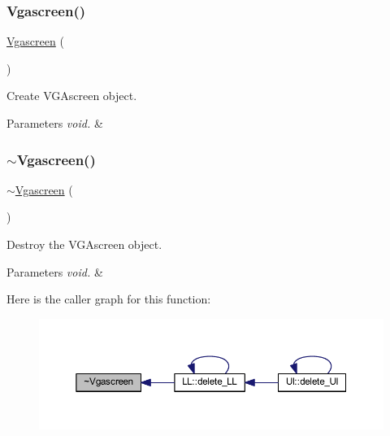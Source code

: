 \subsubsection{\texorpdfstring{Vgascreen()}{Vgascreen()}}
{\footnotesize\ttfamily \mbox{\hyperlink{class_vgascreen}{Vgascreen}} (\begin{DoxyParamCaption}\item[{void}]{ }\end{DoxyParamCaption})}



Create V\+G\+Ascreen object. 


\begin{DoxyParams}{Parameters}
{\em void.} & \\
\hline
\end{DoxyParams}
\mbox{\label{class_vgascreen_aac39d059f15042b0d763c6a173540552}} 
\subsubsection{\texorpdfstring{$\sim$\+Vgascreen()}{~Vgascreen()}}
{\footnotesize\ttfamily $\sim$\mbox{\hyperlink{class_vgascreen}{Vgascreen}} (\begin{DoxyParamCaption}\item[{void}]{ }\end{DoxyParamCaption})\hspace{0.3cm}{\ttfamily [virtual]}}



Destroy the V\+G\+Ascreen object. 


\begin{DoxyParams}{Parameters}
{\em void.} & \\
\hline
\end{DoxyParams}
Here is the caller graph for this function\+:\nopagebreak
\begin{figure}[H]
\begin{center}
\leavevmode
\includegraphics[width=350pt]{class_vgascreen_aac39d059f15042b0d763c6a173540552_icgraph}
\end{center}
\end{figure}


